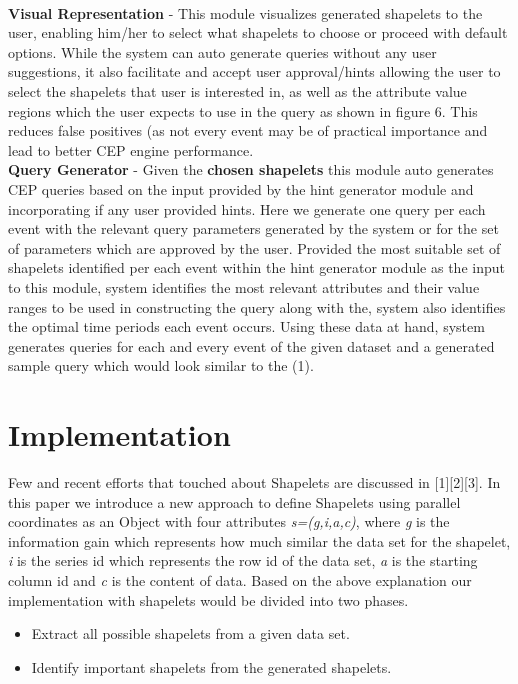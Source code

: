 \documentclass[conference]{IEEEtran}  %
\begin{document}
\smallskip\\
\textbf{Visual Representation} - This module visualizes generated shapelets to the user, enabling him/her to select what shapelets to choose or proceed with default options. While the system can auto generate queries without any user suggestions, it also facilitate and accept user approval/hints allowing the user to select the shapelets that user is interested in, as well as the attribute value regions which the user expects to use in the query as shown in figure 6. This reduces false positives (as not every event may be of practical importance and lead to better CEP engine performance.
\smallskip\\
\textbf{Query Generator} - Given the \textbf{chosen shapelets} this module auto generates CEP queries based on the input provided by the hint generator module and incorporating if any user provided hints. Here we generate one query per each event with the relevant query parameters generated by the system or for the set of parameters which are approved by the user. Provided the most suitable set of shapelets identified per each event within the hint generator module as the input to this module, system identifies the most relevant attributes and their value ranges to be used in constructing the query along with the, system also identifies the optimal time periods each event occurs. Using these data at hand, system generates queries for each and every event of the given dataset and a generated sample query which would look similar to the (1).

\section{Implementation}
Few and recent efforts that touched about Shapelets are discussed in [1][2][3]. In this paper we introduce a new approach to define Shapelets using parallel coordinates as an Object with four attributes \textit{s=(g,i,a,c)}, where \textit{g} is the information gain which represents how much similar the data set for the shapelet, \textit{i} is the series id which represents the row id of the data set, \textit{a} is the starting column id and \textit{c} is the content of data. Based on the above explanation our implementation with shapelets would be divided into two phases.

\begin{itemize}
\item Extract all possible shapelets from a given data set.
\item Identify important shapelets from the generated shapelets.
\end{itemize}
\end{document}

